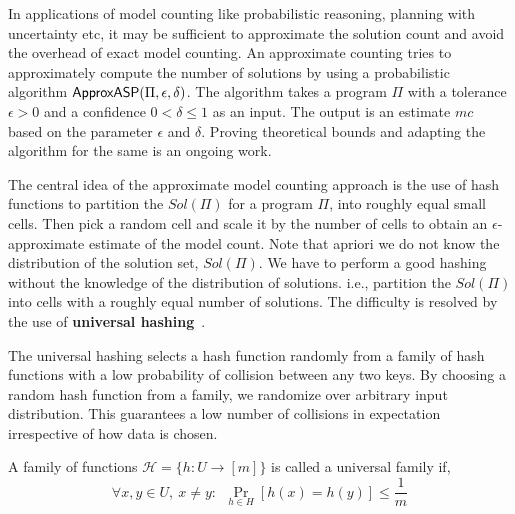 \documentclass{svproc}
\newcommand{\fff}{\ensuremath{\Pi}\xspace}
\newcommand{\mc}{$mc$\xspace}
\newcommand{\ep}{$\epsilon$\xspace}
\newcommand{\del}{$\delta$\xspace}
\def\appasp{\normalfont \textsf{ApproxASP}\xspace}
\newcommand{\sol}{$Sol(\Pi)$\xspace}
\begin{document}
In applications of model counting like probabilistic reasoning, planning with uncertainty etc, it may be sufficient to approximate the solution count and avoid the overhead of exact model counting.
%
An approximate counting tries to approximately compute the number of solutions by using a probabilistic algorithm $\appasp(\fff, \epsilon, \delta)$.
%
The algorithm takes a program $\fff$ with a tolerance $\epsilon > 0$ and a confidence $0 < \delta \leq 1$ as an input.
%
The output is an estimate \mc based on the parameter \ep and \del.
%
Proving theoretical bounds and adapting the algorithm for the same is an ongoing work.

The central idea of the approximate model counting approach is the use of hash functions to partition the \sol for a program $\fff$, into roughly equal small cells.
%
Then pick a random cell and scale it by the number of cells to obtain an \ep-approximate estimate of the model count.
%
Note that apriori we do not know the distribution of the solution set, \sol.
%
We have to perform a good hashing without the knowledge of the distribution of solutions. i.e., partition the $Sol(\Pi)$ into cells with a roughly equal number of solutions.
%
%
%
The difficulty is resolved by the use of \textbf{universal hashing}~\cite{DBLP:conf/stoc/CarterW77}.

The universal hashing selects a hash function randomly from a family of hash functions with a low probability of collision between any two keys. 
%
By choosing a random hash function from a family, we randomize over arbitrary input distribution. This guarantees a low number of collisions in expectation irrespective of how data is chosen.

\begin{definition}
A family of functions $\mathcal{H}=\{h: U \to [m]\}$  is called a universal family if,
\[ \forall x,y\in U,~x\neq y:~~\Pr _{h\in H}[h(x)=h(y)]\leq {\frac {1}{m}} \]
\end{definition}
\end{document}
